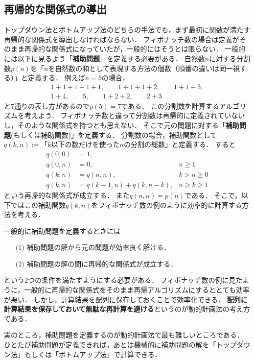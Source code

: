 \documentclass[a4paper,twoside,onecolumn,openany,article]{memoir}
\theoremstyle{remark}
\begin{document}
\subsection{再帰的な関係式の導出}
トップダウン法とボトムアップ法のどちらの手法でも，まず最初に関数が満たす再帰的な関係式を導出しなければならない．
フィボナッチ数の場合は定義がそのまま再帰的な関係式になっていたが，一般的にはそうとは限らない．
一般的には以下に見るよう「\textbf{補助問題}」を定義する必要がある．
自然数$n$に対する分割数$p(n)$を「$n$を自然数の和として表現する方法の個数（順番の違いは同一視する）」と定義する．
例えば$n=5$の場合，
\begin{align*}
1+1+1+1+1,\qquad 1+1+1+2,\qquad 1+1+3,\\
1+4,\qquad 5,\qquad 1+2+2,\qquad 2+3
\end{align*}
と7通りの表し方があるので$p(5)=7$である．
この分割数を計算するアルゴリズムを考えよう．
フィボナッチ数と違って分割数は再帰的に定義されていないし，そのような関係式を持つとも思えない．
そこで元の問題に対する「\textbf{補助問題}(もしくは補助関数)」を定義する．
分割数の場合，補助関数として$q(k,n):=\text{「$k$以下の数だけを使った$n$の分割の総数」}$と定義する．
すると
\begin{align*}
q(0,0) &= 1,\\
q(0,n) &= 0,& n \ge 1\\
q(k,n) &= q(n,n),& k > n\ge 0\\
q(k,n) &= q(k-1,n) + q(k, n-k),& n\ge k\ge 1
\end{align*}
という再帰的な関係式が成立する．
また$q(n,n)=p(n)$である．
そこで，以下ではこの補助関数$q(k,n)$をフィボナッチ数の例のように効率的に計算する方法を考える．

一般的に補助問題を定義するときには
\begin{itemize}
\item[(1)] 補助問題の解から元の問題が効率良く解ける．
\item[(2)] 補助問題の解の間に再帰的な関係式が成立する．
\end{itemize}
という2つの条件を満たすようにする必要がある．
フィボナッチ数の例に見たように，一般的に再帰的な関係式をそのまま再帰アルゴリズムにするととても効率が悪い．
しかし，計算結果を配列に保存しておくことで効率化できる．
\textbf{配列に計算結果を保存しておいて無駄な再計算を避ける}というのが動的計画法の考え方である．


実のところ，補助問題を定義するのが動的計画法で最も難しいところである．
ひとたび補助問題が定義できれば，あとは機械的に補助問題の解を「トップダウン法」もしくは「ボトムアップ法」で計算できる．
\end{document}
